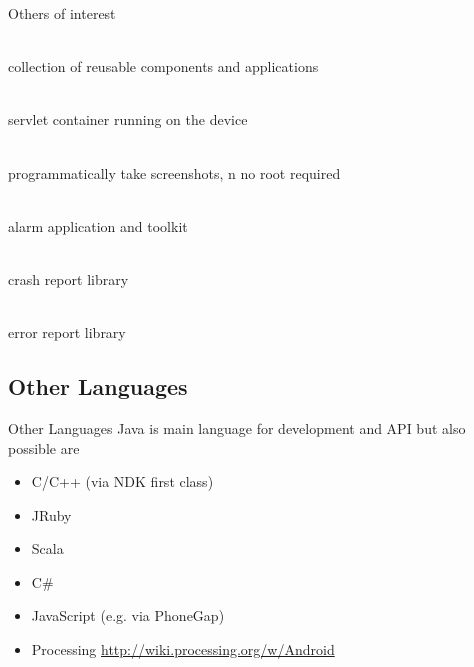 \documentclass[aspectratio=169]{beamer}
\newcommand{\surl}[1] {{\tiny \url{#1}}}
\begin{document}
    \begin{frame}{Others of interest}
      \begin{description}
        \item<1->[OpenIntents \surl{http://code.google.com/p/openintents/}] \hfill \\ collection of reusable components and applications
        \item<2->[i-jetty \surl{http://code.google.com/p/i-jetty/}] \hfill \\ servlet container running on the device 
        \item<3->[Android Screenshot library \surl{http://code.google.com/p/android-screenshot-library/}] \hfill \\  programmatically take screenshots, n no root required 
        \item<4->[Android Alarm Database \surl{http://code.google.com/p/android-alarm-database/}] \hfill \\ alarm application and toolkit 
        \item<5->[Application Crash Report for Android ACRA \surl{http://code.google.com/p/acra/}] \hfill \\ crash report library
        \item<6->[Android Error Reporter \surl{https://github.com/tomquist/Android-Error-Reporter}] \hfill \\ error report library
      \end{description}
    \end{frame}

  \subsection{Other Languages}
    \begin{frame}{Other Languages}
      Java is main language for development and API but also possible are 
      \begin{itemize}
      \item C/C++ (via NDK first class)
      \item JRuby
      \item Scala
      \item C\#
      \item JavaScript (e.g. via PhoneGap)
      \item Processing \surl{http://wiki.processing.org/w/Android}
      \end{itemize}
    \end{frame}
\end{document}
